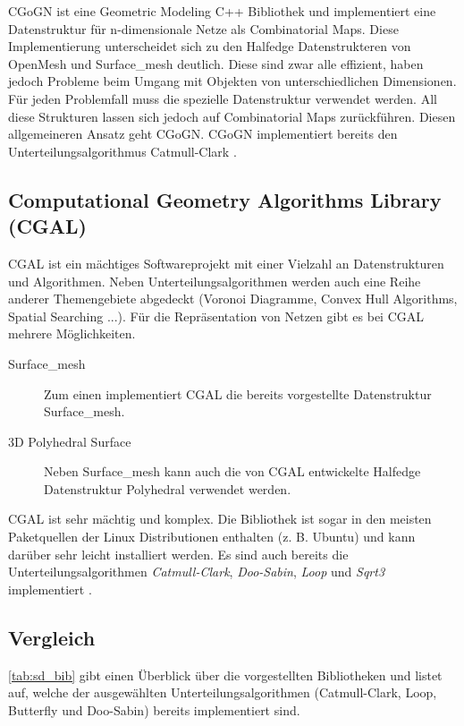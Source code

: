 CGoGN ist eine Geometric Modeling C++ Bibliothek und implementiert eine Datenstruktur für n-dimensionale Netze als Combinatorial Maps.
Diese Implementierung unterscheidet sich zu den Halfedge Datenstrukteren von OpenMesh und Surface\_mesh deutlich.
Diese sind zwar alle effizient, haben jedoch Probleme beim Umgang mit Objekten von unterschiedlichen Dimensionen.
Für jeden Problemfall muss die spezielle Datenstruktur verwendet werden.
All diese Strukturen lassen sich jedoch auf Combinatorial Maps zurückführen.
Diesen allgemeineren Ansatz geht CGoGN.
CGoGN implementiert bereits den Unterteilungsalgorithmus Catmull-Clark \cite{CGoGN.27.07.2015}. 

\subsection{Computational Geometry Algorithms Library (CGAL)}

CGAL ist ein mächtiges Softwareprojekt mit einer Vielzahl an Datenstrukturen und Algorithmen.
Neben Unterteilungsalgorithmen werden auch eine Reihe anderer Themengebiete abgedeckt (Voronoi Diagramme, Convex Hull Algorithms, Spatial Searching ...).
Für die Repräsentation von Netzen gibt es bei CGAL mehrere Möglichkeiten.

\begin{description}
 \item[Surface\_mesh] Zum einen implementiert CGAL die bereits vorgestellte Datenstruktur Surface\_mesh.
 \item[3D Polyhedral Surface] Neben Surface\_mesh kann auch die von CGAL entwickelte Halfedge Datenstruktur Polyhedral verwendet werden.
\end{description}

CGAL ist sehr mächtig und komplex. Die Bibliothek ist sogar in den meisten Paketquellen der Linux Distributionen enthalten (z. B. Ubuntu)
und kann darüber sehr leicht installiert werden.
Es sind auch bereits die Unterteilungsalgorithmen \emph{Catmull-Clark}, \emph{Doo-Sabin}, \emph{Loop} und \emph{Sqrt3} implementiert \cite{CGAL.27.07.2015}.

\subsection{Vergleich}

\autoref{tab:sd_bib} gibt einen Überblick über die vorgestellten Bibliotheken und listet auf, welche der ausgewählten Unterteilungsalgorithmen
(Catmull-Clark, Loop, Butterfly und Doo-Sabin) bereits implementiert sind.

